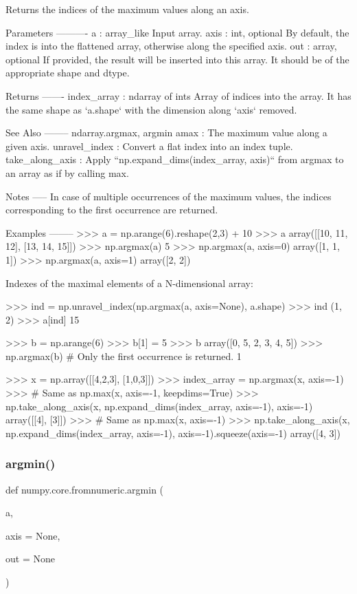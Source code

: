 \begin{DoxyVerb}Returns the indices of the maximum values along an axis.

Parameters
----------
a : array_like
    Input array.
axis : int, optional
    By default, the index is into the flattened array, otherwise
    along the specified axis.
out : array, optional
    If provided, the result will be inserted into this array. It should
    be of the appropriate shape and dtype.

Returns
-------
index_array : ndarray of ints
    Array of indices into the array. It has the same shape as `a.shape`
    with the dimension along `axis` removed.

See Also
--------
ndarray.argmax, argmin
amax : The maximum value along a given axis.
unravel_index : Convert a flat index into an index tuple.
take_along_axis : Apply ``np.expand_dims(index_array, axis)``
                  from argmax to an array as if by calling max.

Notes
-----
In case of multiple occurrences of the maximum values, the indices
corresponding to the first occurrence are returned.

Examples
--------
>>> a = np.arange(6).reshape(2,3) + 10
>>> a
array([[10, 11, 12],
       [13, 14, 15]])
>>> np.argmax(a)
5
>>> np.argmax(a, axis=0)
array([1, 1, 1])
>>> np.argmax(a, axis=1)
array([2, 2])

Indexes of the maximal elements of a N-dimensional array:

>>> ind = np.unravel_index(np.argmax(a, axis=None), a.shape)
>>> ind
(1, 2)
>>> a[ind]
15

>>> b = np.arange(6)
>>> b[1] = 5
>>> b
array([0, 5, 2, 3, 4, 5])
>>> np.argmax(b)  # Only the first occurrence is returned.
1

>>> x = np.array([[4,2,3], [1,0,3]])
>>> index_array = np.argmax(x, axis=-1)
>>> # Same as np.max(x, axis=-1, keepdims=True)
>>> np.take_along_axis(x, np.expand_dims(index_array, axis=-1), axis=-1)
array([[4],
       [3]])
>>> # Same as np.max(x, axis=-1)
>>> np.take_along_axis(x, np.expand_dims(index_array, axis=-1), axis=-1).squeeze(axis=-1)
array([4, 3])\end{DoxyVerb}
 \mbox{\label{namespacenumpy_1_1core_1_1fromnumeric_adae8749dfce336e200e9c0f0e899dc8a}} 
\subsubsection{\texorpdfstring{argmin()}{argmin()}}
{\footnotesize\ttfamily def numpy.\+core.\+fromnumeric.\+argmin (\begin{DoxyParamCaption}\item[{}]{a,  }\item[{}]{axis = {\ttfamily None},  }\item[{}]{out = {\ttfamily None} }\end{DoxyParamCaption})}

